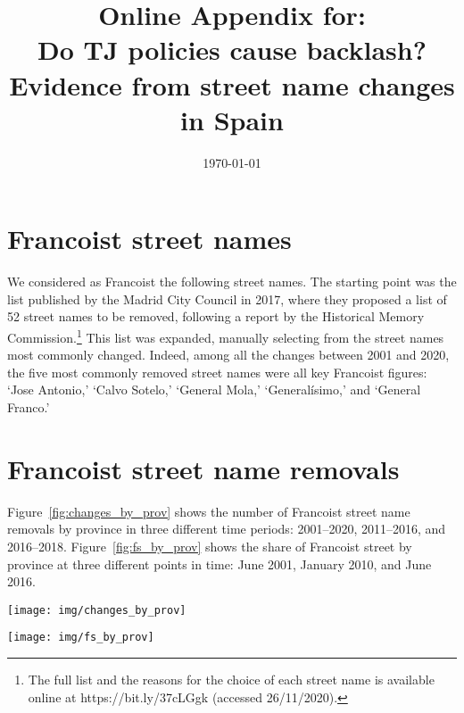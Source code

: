 \documentclass[12pt, titlepage]{article}
\title{\Large Online Appendix for:\\Do TJ policies cause backlash?\\Evidence from street name changes in Spain}
\author{}
\date{\today}
\begin{document}
\maketitle

\tableofcontents

\section{Francoist street names}

We considered as Francoist the following street names. The starting point was the list published by the Madrid City Council in 2017, where they proposed a list of 52 street names to be removed, following a report by the Historical Memory Commission.\footnote{The full list and the reasons for the choice of each street name is available online at https://bit.ly/37cLGgk (accessed 26/11/2020).}
This list was expanded, manually selecting from the street names most commonly changed.
Indeed, among all the changes between 2001 and 2020, the five most commonly removed street names were all key Francoist figures: `Jose Antonio,' `Calvo Sotelo,' `General Mola,' `Generalísimo,' and `General Franco.'

\begin{quote}
  
\end{quote}

\section{Francoist street name removals}

Figure~\ref{fig:changes_by_prov} shows the number of Francoist street name removals by province in three different time periods: 2001--2020, 2011--2016, and 2016--2018.
Figure~\ref{fig:fs_by_prov} shows the share of Francoist street by province at three different points in time: June 2001, January 2010, and June 2016.

\begin{figure*}[htb!]
\centering

  \texttt{[image: img/changes\_by\_prov]}

  \caption{Number of Francoist street name removals over time}\label{fig:changes_by_prov}

\end{figure*}

\begin{figure*}[htb!]
\centering

  \texttt{[image: img/fs\_by\_prov]}

  \caption{Share of Francoist streets in each province}\label{fig:fs_by_prov}

\end{figure*}
\end{document}
